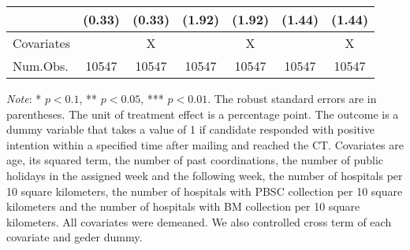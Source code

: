 \documentclass[12pt, a4paper]{article}
\begin{document}
\begin{table}[H]
\begin{threeparttable}
\begin{tabular}[t]{lcccccc}
 & (\num{0.33}) & (\num{0.33}) & (\num{1.92}) & (\num{1.92}) & (\num{1.44}) & (\num{1.44})\\
\midrule
Covariates &  & X &  & X &  & X\\
Num.Obs. & \num{10547} & \num{10547} & \num{10547} & \num{10547} & \num{10547} & \num{10547}\\
\bottomrule
\end{tabular}
\begin{tablenotes}
\item \emph{Note}: * $p < 0.1$, ** $p < 0.05$, *** $p < 0.01$. The robust standard errors are in parentheses. The unit of treatment effect is a percentage point. The outcome is a dummy variable that takes a value of 1 if candidate responded with positive intention within a specified time after mailing and reached the CT. Covariates are age, its squared term, the number of past coordinations, the number of public holidays in the assigned week and the following week, the number of hospitals per 10 square kilometers, the number of hospitals with PBSC collection per 10 square kilometers and the number of hospitals with BM collection per 10 square kilometers. All covariates were demeaned. We also controlled cross term of each covariate and geder dummy.
\end{tablenotes}
\end{threeparttable}
\end{table}
\end{document}

